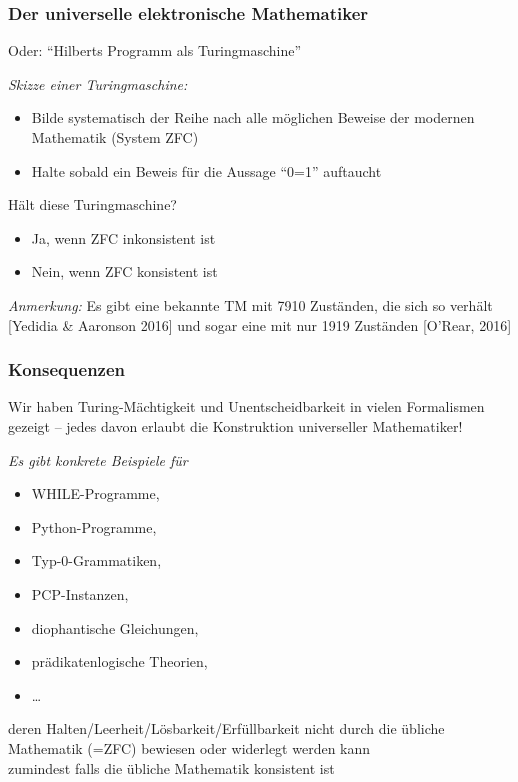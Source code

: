 \documentclass[aspectratio=1610,onlymath]{beamer}
\begin{document}
\begin{frame}\frametitle{Der universelle elektronische Mathematiker}

Oder: "`Hilberts Programm als Turingmaschine"'
\bigskip

\emph{Skizze einer Turingmaschine:}
\begin{itemize}
\item Bilde systematisch der Reihe nach alle möglichen Beweise der modernen Mathematik (System ZFC)
\item Halte sobald ein Beweis für die Aussage "`0=1"' auftaucht
\end{itemize}
\alert{Hält diese Turingmaschine?}\pause
\begin{itemize}
\item Ja, wenn ZFC inkonsistent ist
\item Nein, wenn ZFC konsistent ist
\end{itemize}\pause
\bigskip

\pause\medskip

\emph{Anmerkung:} Es gibt eine bekannte TM mit 7910 Zuständen, die sich so verhält [Yedidia \& Aaronson 2016] und sogar eine mit nur 1919 Zuständen [O’Rear, 2016]

\end{frame}

\begin{frame}\frametitle{Konsequenzen}

Wir haben Turing-Mächtigkeit und Unentscheidbarkeit in vielen Formalismen gezeigt -- jedes davon erlaubt die Konstruktion universeller Mathematiker!
\bigskip

\emph{Es gibt konkrete Beispiele für}
\begin{itemize}
\item WHILE-Programme,
\item Python-Programme,
\item Typ-0-Grammatiken,
\item PCP-Instanzen,
\item diophantische Gleichungen,
\item prädikatenlogische Theorien,
\item \ldots
\end{itemize}
deren Halten/Leerheit/Lösbarkeit/Erfüllbarkeit nicht durch die übliche Mathematik (=ZFC) bewiesen oder widerlegt werden kann\\[-0.5ex]
{\tiny zumindest falls die übliche Mathematik konsistent ist}

\end{frame}
\end{document}
